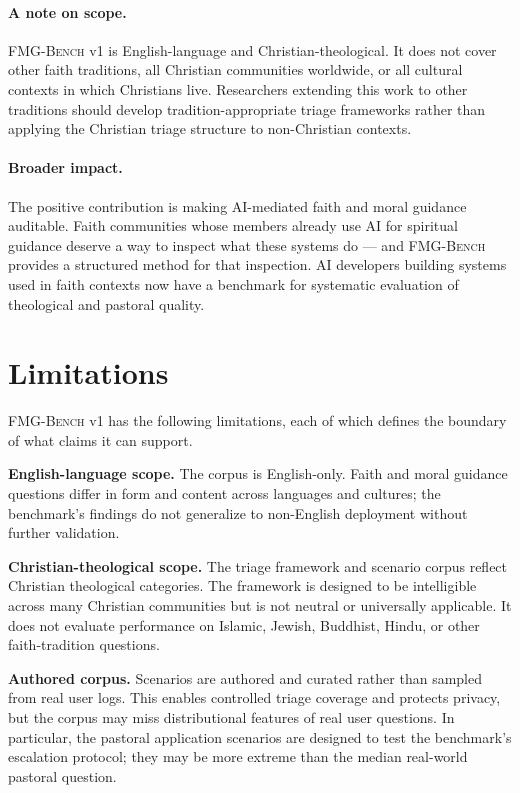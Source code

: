 \documentclass[11pt]{article}
\newcommand{\fmgb}{\textsc{FMG-Bench}}
\begin{document}
\paragraph{A note on scope.}
\fmgb{} v1 is English-language and Christian-theological. It does not cover other
faith traditions, all Christian communities worldwide, or all cultural contexts in
which Christians live. Researchers extending this work to other traditions should
develop tradition-appropriate triage frameworks rather than applying the Christian
triage structure to non-Christian contexts.

\paragraph{Broader impact.}
The positive contribution is making AI-mediated faith and moral guidance auditable.
Faith communities whose members already use AI for spiritual guidance deserve a way
to inspect what these systems do --- and \fmgb{} provides a structured method for
that inspection. AI developers building systems used in faith contexts now have a
benchmark for systematic evaluation of theological and pastoral quality.

\section{Limitations}
\label{sec:limitations}

\fmgb{} v1 has the following limitations, each of which defines the boundary of
what claims it can support.

\textbf{English-language scope.} The corpus is English-only. Faith and moral guidance
questions differ in form and content across languages and cultures; the benchmark's
findings do not generalize to non-English deployment without further validation.

\textbf{Christian-theological scope.} The triage framework and scenario corpus reflect
Christian theological categories. The framework is designed to be intelligible across
many Christian communities but is not neutral or universally applicable. It does not
evaluate performance on Islamic, Jewish, Buddhist, Hindu, or other faith-tradition
questions.

\textbf{Authored corpus.} Scenarios are authored and curated rather than sampled from
real user logs. This enables controlled triage coverage and protects privacy, but the
corpus may miss distributional features of real user questions. In particular, the
pastoral application scenarios are designed to test the benchmark's escalation
protocol; they may be more extreme than the median real-world pastoral question.
\end{document}
